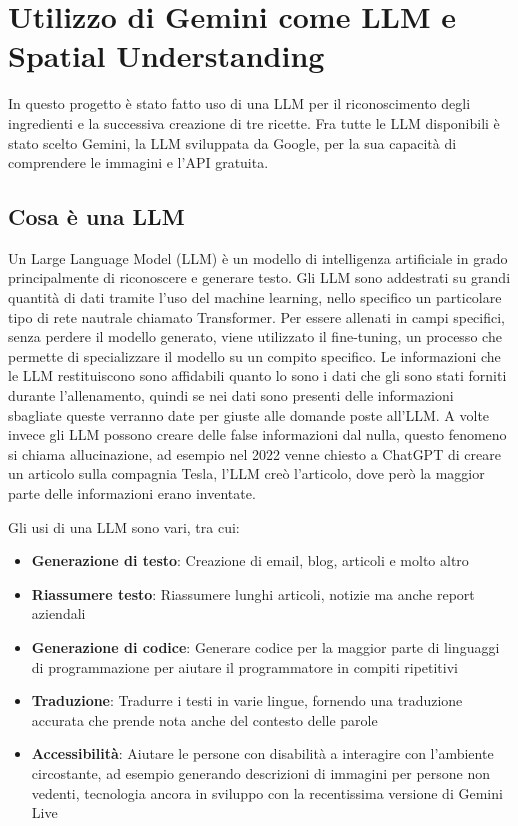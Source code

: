\chapter{Utilizzo di Gemini come LLM e Spatial Understanding}
\pagestyle{plain}
In questo progetto è stato fatto uso di una LLM per il riconoscimento degli ingredienti e la successiva creazione di tre ricette. Fra tutte le LLM disponibili è stato scelto Gemini, la LLM sviluppata da Google, per la sua capacità di comprendere le immagini e l'API gratuita.

\section{Cosa è una LLM}
Un Large Language Model (LLM) è un modello di intelligenza artificiale in grado principalmente di riconoscere e generare testo. Gli LLM sono addestrati su grandi quantità di dati tramite l'uso del machine learning, nello specifico un particolare tipo di rete nautrale chiamato Transformer. Per essere allenati in campi specifici, senza perdere il modello generato, viene utilizzato il fine-tuning, un processo che permette di specializzare il modello su un compito specifico.
Le informazioni che le LLM restituiscono sono affidabili quanto lo sono i dati che gli sono stati forniti durante l'allenamento, quindi se nei dati sono presenti delle informazioni sbagliate queste verranno date per giuste alle domande poste all'LLM. A volte invece gli LLM possono creare delle false informazioni dal nulla, questo fenomeno si chiama allucinazione, ad esempio nel 2022 venne chiesto a ChatGPT di creare un articolo sulla compagnia Tesla, l'LLM creò l'articolo, dove però la maggior parte delle informazioni erano inventate.\cite{LLMCloudflare}

Gli usi di una LLM sono vari, tra cui:
\begin{itemize}
    \item \textbf{Generazione di testo}: Creazione di email, blog, articoli e molto altro
    \item \textbf{Riassumere testo}: Riassumere lunghi articoli, notizie ma anche report aziendali
    \item \textbf{Generazione di codice}: Generare codice per la maggior parte di linguaggi di programmazione per aiutare il programmatore in compiti ripetitivi 
    \item \textbf{Traduzione}: Tradurre i testi in varie lingue, fornendo una traduzione accurata che prende nota anche del contesto delle parole
    \item \textbf{Accessibilità}: Aiutare le persone con disabilità a interagire con l'ambiente circostante, ad esempio generando descrizioni di immagini per persone non vedenti, tecnologia ancora in sviluppo con la recentissima versione di Gemini Live
\end{itemize}
\cite{LLMIBM} \cite{GeminiLiveBlog} \cite{GeminiLiveYoutube}


